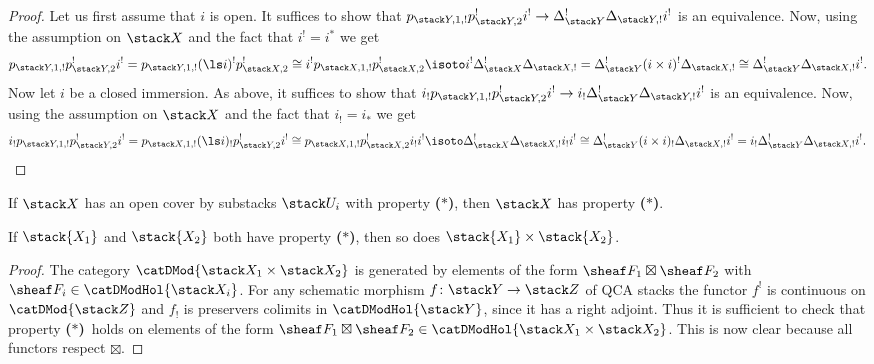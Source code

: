\documentclass{ck-article}
\newcommand\bc{\textbf{($\mathbf{*}$)}}
\begin{document}
\begin{proof}
    Let us first assume that $i$ is open.
    It suffices to show that $p_{\stack Y,1,!}p_{\stack Y,2}^!i^! \to \Delta_{\stack Y}^!\Delta_{\stack Y,!}i^!$ is an equivalence.
    Now, using the assumption on $\stack X$ and the fact that $i^! = i^*$ we get
    \[
        p_{\stack Y,1,!} p_{\stack Y,2}^!i^! =
        p_{\stack Y,1,!} (\ls i)^! p_{\stack X,2}^! \cong
        i^! p_{\stack X,1,!} p_{\stack X,2}^! \isoto
        i^! \Delta_{\stack X}^! \Delta_{\stack X,!} =
        \Delta_{\stack Y}^! (i\times i)^! \Delta_{\stack X,!} \cong
        \Delta_{\stack Y}^! \Delta_{\stack X,!} i^!.
    \]
    Now let $i$ be a closed immersion.
    As above, it suffices to show that $i_!p_{\stack Y,1,!}p_{\stack Y,2}^!i^! \to i_!\Delta_{\stack Y}^!\Delta_{\stack Y,!}i^!$ is an equivalence.
    Now, using the assumption on $\stack X$ and the fact that $i_! = i_*$ we get
    \[
        i_! p_{\stack Y,1,!} p_{\stack Y,2}^!i^! =
        p_{\stack X,1,!} (\ls i)_! p_{\stack Y,2}^!i^! \cong
        p_{\stack X,1,!} p_{\stack X,2}^! i_!i^! \isoto
        \Delta_{\stack X}^! \Delta_{\stack X,!} i_!i^! \cong
        \Delta_{\stack Y}^! (i\times i)_! \Delta_{\stack X,!}i^! =
        i_! \Delta_{\stack Y}^! \Delta_{\stack X,!} i^!.
        \qedhere
    \]
\end{proof}

\begin{Lem}\label{lem:bc_open_cover}
    If $\stack X$ has an open cover by substacks $\stack U_i$ with property \bc, then $\stack X$ has property \bc.
\end{Lem}

\begin{Lem}\label{lem:bc_product}
    If $\stack{X_1}$ and $\stack{X_2}$ both have property \bc, then so does $\stack{X_1} \times \stack{X_2}$.
\end{Lem}

\begin{proof}
    The category $\catDMod{\stack X_1 \times \stack X_2}$ is generated by elements of the form $\sheaf F_1 \boxtimes \sheaf F_2$ with $\sheaf F_i \in \catDModHol{\stack X_i}$.
    For any schematic morphism $f\colon \stack Y \to \stack Z$ of QCA stacks the functor $f^!$ is continuous on $\catDMod{\stack Z}$ and $f_!$ is preservers colimits in $\catDModHol{\stack Y}$, since it has a right adjoint.
    Thus it is sufficient to check that property \bc\ holds on elements of the form $\sheaf F_1 \boxtimes \sheaf F_2 \in \catDModHol{\stack X_1 \times \stack X_2}$.
    This is now clear because all functors respect $\boxtimes$.
\end{proof}
\end{document}

